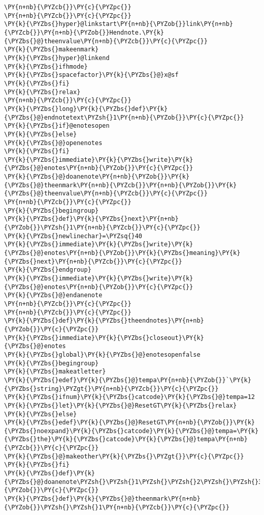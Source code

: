 \begin{Verbatim}[commandchars=\\\{\}]
\PY{n+nb}{\PYZcb{}}\PY{c}{\PYZpc{}}
\PY{n+nb}{\PYZcb{}}\PY{c}{\PYZpc{}}
\PY{k}{\PYZbs{}hyper}@linkstart\PY{n+nb}{\PYZob{}}link\PY{n+nb}{\PYZcb{}}\PY{n+nb}{\PYZob{}}Hendnote.\PY{k}{\PYZbs{}@}theenvalue\PY{n+nb}{\PYZcb{}}\PY{c}{\PYZpc{}}
\PY{k}{\PYZbs{}makeenmark}
\PY{k}{\PYZbs{}hyper}@linkend
\PY{k}{\PYZbs{}ifhmode}
\PY{k}{\PYZbs{}spacefactor}\PY{k}{\PYZbs{}@}x@sf
\PY{k}{\PYZbs{}fi}
\PY{k}{\PYZbs{}relax}
\PY{n+nb}{\PYZcb{}}\PY{c}{\PYZpc{}}
\PY{k}{\PYZbs{}long}\PY{k}{\PYZbs{}def}\PY{k}{\PYZbs{}@}endnotetext\PYZsh{}1\PY{n+nb}{\PYZob{}}\PY{c}{\PYZpc{}}
\PY{k}{\PYZbs{}if}@enotesopen
\PY{k}{\PYZbs{}else}
\PY{k}{\PYZbs{}@}openenotes
\PY{k}{\PYZbs{}fi}
\PY{k}{\PYZbs{}immediate}\PY{k}{\PYZbs{}write}\PY{k}{\PYZbs{}@}enotes\PY{n+nb}{\PYZob{}}\PY{c}{\PYZpc{}}
\PY{k}{\PYZbs{}@}doanenote\PY{n+nb}{\PYZob{}}\PY{k}{\PYZbs{}@}theenmark\PY{n+nb}{\PYZcb{}}\PY{n+nb}{\PYZob{}}\PY{k}{\PYZbs{}@}theenvalue\PY{n+nb}{\PYZcb{}}\PY{c}{\PYZpc{}}
\PY{n+nb}{\PYZcb{}}\PY{c}{\PYZpc{}}
\PY{k}{\PYZbs{}begingroup}
\PY{k}{\PYZbs{}def}\PY{k}{\PYZbs{}next}\PY{n+nb}{\PYZob{}}\PYZsh{}1\PY{n+nb}{\PYZcb{}}\PY{c}{\PYZpc{}}
\PY{k}{\PYZbs{}newlinechar}=\PYZsq{}40
\PY{k}{\PYZbs{}immediate}\PY{k}{\PYZbs{}write}\PY{k}{\PYZbs{}@}enotes\PY{n+nb}{\PYZob{}}\PY{k}{\PYZbs{}meaning}\PY{k}{\PYZbs{}next}\PY{n+nb}{\PYZcb{}}\PY{c}{\PYZpc{}}
\PY{k}{\PYZbs{}endgroup}
\PY{k}{\PYZbs{}immediate}\PY{k}{\PYZbs{}write}\PY{k}{\PYZbs{}@}enotes\PY{n+nb}{\PYZob{}}\PY{c}{\PYZpc{}}
\PY{k}{\PYZbs{}@}endanenote
\PY{n+nb}{\PYZcb{}}\PY{c}{\PYZpc{}}
\PY{n+nb}{\PYZcb{}}\PY{c}{\PYZpc{}}
\PY{k}{\PYZbs{}def}\PY{k}{\PYZbs{}theendnotes}\PY{n+nb}{\PYZob{}}\PY{c}{\PYZpc{}}
\PY{k}{\PYZbs{}immediate}\PY{k}{\PYZbs{}closeout}\PY{k}{\PYZbs{}@}enotes
\PY{k}{\PYZbs{}global}\PY{k}{\PYZbs{}@}enotesopenfalse
\PY{k}{\PYZbs{}begingroup}
\PY{k}{\PYZbs{}makeatletter}
\PY{k}{\PYZbs{}edef}\PY{k}{\PYZbs{}@}tempa\PY{n+nb}{\PYZob{}}`\PY{k}{\PYZbs{}string}\PYZgt{}\PY{n+nb}{\PYZcb{}}\PY{c}{\PYZpc{}}
\PY{k}{\PYZbs{}ifnum}\PY{k}{\PYZbs{}catcode}\PY{k}{\PYZbs{}@}tempa=12
\PY{k}{\PYZbs{}let}\PY{k}{\PYZbs{}@}ResetGT\PY{k}{\PYZbs{}relax}
\PY{k}{\PYZbs{}else}
\PY{k}{\PYZbs{}edef}\PY{k}{\PYZbs{}@}ResetGT\PY{n+nb}{\PYZob{}}\PY{k}{\PYZbs{}noexpand}\PY{k}{\PYZbs{}catcode}\PY{k}{\PYZbs{}@}tempa=\PY{k}{\PYZbs{}the}\PY{k}{\PYZbs{}catcode}\PY{k}{\PYZbs{}@}tempa\PY{n+nb}{\PYZcb{}}\PY{c}{\PYZpc{}}
\PY{k}{\PYZbs{}@}makeother\PY{k}{\PYZbs{}\PYZgt{}}\PY{c}{\PYZpc{}}
\PY{k}{\PYZbs{}fi}
\PY{k}{\PYZbs{}def}\PY{k}{\PYZbs{}@}doanenote\PYZsh{}\PYZsh{}1\PYZsh{}\PYZsh{}2\PYZsh{}\PYZsh{}3\PYZgt{}\PY{n+nb}{\PYZob{}}\PY{c}{\PYZpc{}}
\PY{k}{\PYZbs{}def}\PY{k}{\PYZbs{}@}theenmark\PY{n+nb}{\PYZob{}}\PYZsh{}\PYZsh{}1\PY{n+nb}{\PYZcb{}}\PY{c}{\PYZpc{}}

\end{Verbatim}
